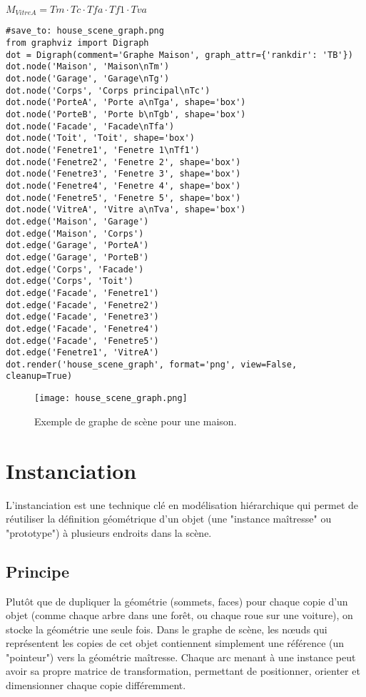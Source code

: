\( M_{VitreA} = Tm \cdot Tc \cdot Tfa \cdot Tf1 \cdot Tva \)
\begin{verbatim}
#save_to: house_scene_graph.png
from graphviz import Digraph
dot = Digraph(comment='Graphe Maison', graph_attr={'rankdir': 'TB'})
dot.node('Maison', 'Maison\nTm')
dot.node('Garage', 'Garage\nTg')
dot.node('Corps', 'Corps principal\nTc')
dot.node('PorteA', 'Porte a\nTga', shape='box')
dot.node('PorteB', 'Porte b\nTgb', shape='box')
dot.node('Facade', 'Facade\nTfa')
dot.node('Toit', 'Toit', shape='box')
dot.node('Fenetre1', 'Fenetre 1\nTf1')
dot.node('Fenetre2', 'Fenetre 2', shape='box')
dot.node('Fenetre3', 'Fenetre 3', shape='box')
dot.node('Fenetre4', 'Fenetre 4', shape='box')
dot.node('Fenetre5', 'Fenetre 5', shape='box')
dot.node('VitreA', 'Vitre a\nTva', shape='box')
dot.edge('Maison', 'Garage')
dot.edge('Maison', 'Corps')
dot.edge('Garage', 'PorteA')
dot.edge('Garage', 'PorteB')
dot.edge('Corps', 'Facade')
dot.edge('Corps', 'Toit')
dot.edge('Facade', 'Fenetre1')
dot.edge('Facade', 'Fenetre2')
dot.edge('Facade', 'Fenetre3')
dot.edge('Facade', 'Fenetre4')
dot.edge('Facade', 'Fenetre5')
dot.edge('Fenetre1', 'VitreA')
dot.render('house_scene_graph', format='png', view=False, cleanup=True)
\end{verbatim}
\begin{figure}[H]
\centering
\texttt{[image: house\_scene\_graph.png]}
\caption{Exemple de graphe de scène pour une maison.}
\label{fig:house_scene_graph}
\end{figure}
\section{Instanciation}
L'instanciation est une technique clé en modélisation hiérarchique qui permet de réutiliser la définition géométrique d'un objet (une "instance maîtresse" ou "prototype") à plusieurs endroits dans la scène.
\subsection{Principe}
Plutôt que de dupliquer la géométrie (sommets, faces) pour chaque copie d'un objet (comme chaque arbre dans une forêt, ou chaque roue sur une voiture), on stocke la géométrie une seule fois. Dans le graphe de scène, les nœuds qui représentent les copies de cet objet contiennent simplement une référence (un "pointeur") vers la géométrie maîtresse.
Chaque arc menant à une instance peut avoir sa propre matrice de transformation, permettant de positionner, orienter et dimensionner chaque copie différemment.
